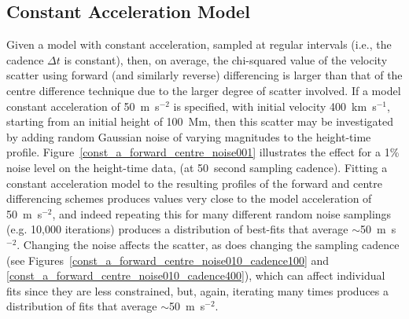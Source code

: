 \documentclass[namedreferences]{SolarPhysics}
\begin{document}
\begin{article}
\subsection{Constant Acceleration Model}

Given a model with constant acceleration, sampled at regular intervals (i.e., the cadence $\Delta t$ is constant), then, on average, the chi-squared value of the velocity scatter using forward (and similarly reverse) differencing is larger than that of the centre difference technique due to the larger degree of scatter involved. If a model constant acceleration of 50~m~s$^{-2}$ is specified, with initial velocity 400~km~s$^{-1}$, starting from an initial height of 100~Mm, then this scatter may be investigated by adding random Gaussian noise of varying magnitudes to the height-time profile. Figure~\ref{const_a_forward_centre_noise001} illustrates the effect for a 1\% noise level on the height-time data, (at 50~second sampling cadence). Fitting a constant acceleration model to the resulting profiles of the forward and centre differencing schemes produces values very close to the model acceleration of 50~m~s$^{-2}$, and indeed repeating this for many different random noise samplings (e.g. 10,000 iterations) produces a distribution of best-fits that average $\sim$50~m~s$^{-2}$. Changing the noise affects the scatter, as does changing the sampling cadence (see Figures~\ref{const_a_forward_centre_noise010_cadence100} and \ref{const_a_forward_centre_noise010_cadence400}), which can affect individual fits since they are less constrained, but, again, iterating many times produces a distribution of fits that average $\sim$50~m~s$^{-2}$.


\end{article}
\end{document}
